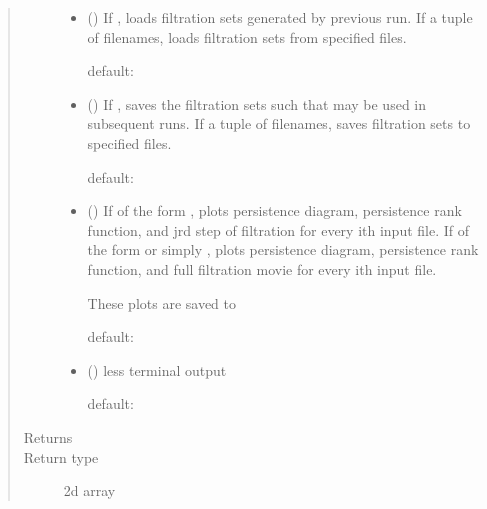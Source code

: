 \documentclass[letterpaper,10pt,openany,oneside,english]{sphinxmanual}
\begin{document}
\begin{fulllineitems}
\begin{quote}
\begin{description}
\begin{itemize}
\item {} 
 (\sphinxstyleliteralemphasis{, }) \textendash{} 
If , loads filtration sets generated by previous run. If a
tuple of filenames, loads filtration sets from specified files.

default: 


\item {} 
 (\sphinxstyleliteralemphasis{, }) \textendash{} 
If , saves the filtration sets such that 
may     be used in subsequent runs. If a tuple of filenames, saves
filtration sets to specified files.

default: 


\item {} 
 (\sphinxstyleliteralemphasis{, }) \textendash{} 
If of the form , plots persistence
diagram, persistence rank function, and jrd step of filtration for
every ith input file. If of the form  or simply
, plots persistence diagram, persistence rank function, and full
filtration movie for every ith input file.

These plots are saved to 

default: 


\item {} 
 (\sphinxstyleliteralemphasis{, }) \textendash{} 
less terminal output

default: 


\end{itemize}

\item[{Returns}] \leavevmode
{}

\item[{Return type}] \leavevmode
2d array

\end{description}\end{quote}

\end{fulllineitems}
\end{document}
